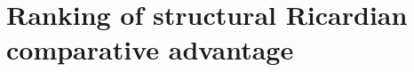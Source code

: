 \section{Ranking of structural Ricardian comparative advantage }

\begin{comment}

\subsection{RCA based on WIOD}
In this subsection I compare the previous results about the RCA for BEL and GER to the results based on the WIOD data.
Firstly, compared to the TiVA data the WIOD data comes at a greater level of dissagregation.
\begin{figure}
\caption{Country pair RCA based on for- and backward  VAX \& EXGR }
\texttt{[image: ./fig/back\_exgr\_DEU\_BEL\_wiod.pdf]}
\texttt{[image: ./fig/forw\_exgr\_DEU\_BEL\_wiod.pdf]}
\end{figure}
\end{comment}
\endinput
